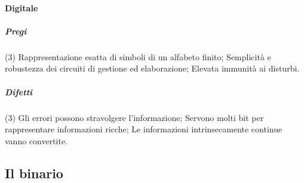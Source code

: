 \paragraph{Digitale}
\subparagraph{Pregi}
\begin{tasks}(3)
	\task Rappresentazione esatta di simboli di un alfabeto finito;
	\task Semplicità e robustezza dei circuiti di gestione ed elaborazione;
	\task Elevata immunità ai disturbi.
\end{tasks}
\subparagraph{Difetti}
\begin{tasks}(3)
	\task Gli errori possono stravolgere l'informazione;
	\task Servono molti bit per rappresentare informazioni ricche;
	\task Le informazioni intrinsecamente continue vanno convertite.
\end{tasks}
\subsection{Il binario}

